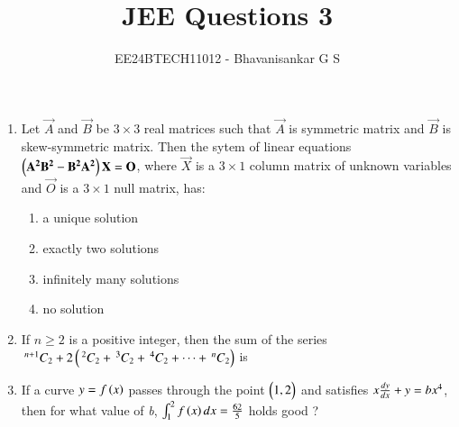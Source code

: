 \documentclass[journal,12pt,onecolumn]{IEEEtran}
\newcommand{\nCr}[2]{\,^{#1}C_{#2}}
\theoremstyle{remark}
\begin{document}

\vspace{3cm}

\title{JEE Questions 3}
\author{EE24BTECH11012 - Bhavanisankar G S}
\maketitle
\newpage
\bigskip

\renewcommand{\thefigure}{\theenumi}
\renewcommand{\thetable}{\theenumi}
\begin{enumerate}
	\item Let $\vec{A}$ and $\vec{B}$ be $3 \times 3$ real matrices such that $\vec{A}$ is symmetric matrix and $\vec{B}$ is skew-symmetric matrix. Then the sytem of linear equations $\left(\mathbf{A^2B^2 - B^2A^2}\right)\mathbf{X} = \mathbf{O}$, where $\vec{X}$ is a $3 \times 1$ column matrix of unknown variables and $\vec{O}$ is a $3 \times 1$ null matrix, has: 
		\begin{enumerate}
			\item a unique solution
			\item exactly two solutions
			\item infinitely many solutions
			\item no solution
		\end{enumerate}
	\item If $ n\geq2 $ is a positive integer, then the sum of the series $\nCr{n+1}{2} + 2\brak{\nCr{2}{2} + \nCr{3}{2} + \nCr{4}{2} + \dots + \nCr{n}{2}}$ is 
		\begin{enumerate}
		\end{enumerate}
	\item If a curve $ y = f\left(x\right) $ passes through the point $\begin{pmatrix}1,2\end{pmatrix}$ and satisfies $ x\frac{dy}{dx} + y = \emph{b}x^4 $, then for what value of \emph{b}, $ \int_{1}^{2} f\left(x\right) dx = \frac{62}{5} $ holds good ?
		\begin{enumerate}
				\begin{multicols}{4}
			\item 5
			\item $\frac{62}{5}$

\end{multicols}
\end{enumerate}
\end{enumerate}
\end{document}
